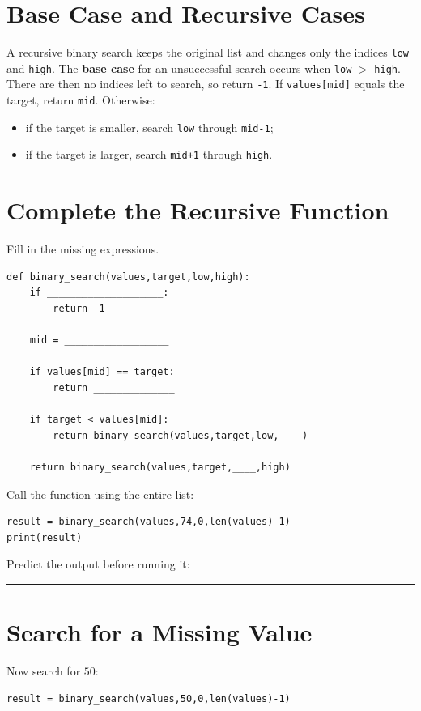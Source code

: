 \documentclass[11pt]{article}
\begin{document}
\section{Base Case and Recursive Cases}
A recursive binary search keeps the original list and changes only the indices \texttt{low} and \texttt{high}. The \textbf{base case} for an unsuccessful search occurs when \texttt{low} $>$ \texttt{high}. There are then no indices left to search, so return \texttt{-1}.  If \texttt{values[mid]} equals the target, return \texttt{mid}. Otherwise: \\
\begin{itemize}
    \item if the target is smaller, search \texttt{low} through \texttt{mid-1};
    \item if the target is larger, search \texttt{mid+1} through \texttt{high}.
\end{itemize}

\section{Complete the Recursive Function}
Fill in the missing expressions.

\begin{Verbatim}[fontsize=\small]
def binary_search(values,target,low,high):
    if ____________________:
        return -1

    mid = __________________

    if values[mid] == target:
        return ______________

    if target < values[mid]:
        return binary_search(values,target,low,____)

    return binary_search(values,target,____,high)
\end{Verbatim}

Call the function using the entire list:
\begin{Verbatim}[fontsize=\small]
result = binary_search(values,74,0,len(values)-1)
print(result)
\end{Verbatim}

Predict the output before running it: \rule{1.5cm}{0.15mm}

\section{Search for a Missing Value}
Now search for \(50\):
\begin{verbatim}
result = binary_search(values,50,0,len(values)-1)
\end{verbatim}
\end{document}
